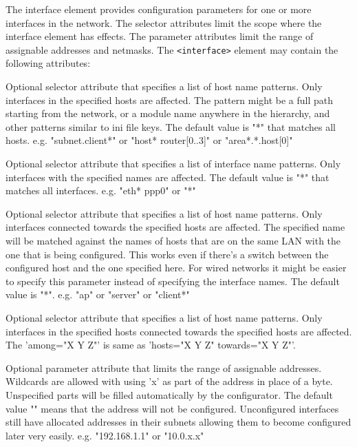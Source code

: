 The interface element provides configuration parameters for one or more
interfaces in the network. The selector attributes limit the scope where
the interface element has effects. The parameter attributes limit the
range of assignable addresses and netmasks.
The \verb!<interface>! element may contain the following attributes:
\begin{compactitem}
    \item {}
      Optional selector attribute that specifies a list of host name patterns.
      Only interfaces in the specified hosts are affected. The pattern might
      be a full path starting from the network, or a module name anywhere in
      the hierarchy, and other patterns similar to ini file keys. The default
      value is "*" that matches all hosts.
      e.g. "subnet.client*" or "host* router[0..3]" or "area*.*.host[0]"

    \item {}
      Optional selector attribute that specifies a list of interface name
      patterns. Only interfaces with the specified names are affected. The
      default value is "*" that matches all interfaces.
      e.g. "eth* ppp0" or "*"

    \item {}
      Optional selector attribute that specifies a list of host name patterns.
      Only interfaces connected towards the specified hosts are affected. The
      specified name will be matched against the names of hosts that are on
      the same LAN with the one that is being configured. This works even if
      there's a switch between the configured host and the one specified here.
      For wired networks it might be easier to specify this parameter instead
      of specifying the interface names. The default value is "*".
      e.g. "ap" or "server" or "client*"

    \item {}
      Optional selector attribute that specifies a list of host name patterns.
      Only interfaces in the specified hosts connected towards the specified
      hosts are affected.
      The 'among="X Y Z"' is same as 'hosts="X Y Z" towards="X Y Z"'.

    \item {}
      Optional parameter attribute that limits the range of assignable
      addresses. Wildcards are allowed with using 'x' as part of the address
      in place of a byte. Unspecified parts will be filled automatically by
      the configurator. The default value "" means that the address will not
      be configured. Unconfigured interfaces still have allocated addresses
      in their subnets allowing them to become configured later very easily.
      e.g. "192.168.1.1" or "10.0.x.x"


\end{compactitem}
